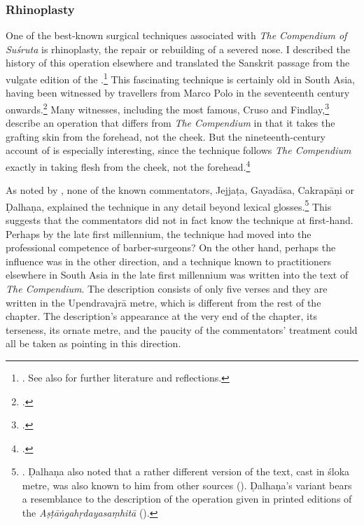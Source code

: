 \subsubsection{Rhinoplasty}
\label{sec:rhinoplasty}

One of the best-known surgical techniques associated with \emph{The 
Compendium of
    Suśruta} is rhinoplasty, the repair or rebuilding of a severed nose. I described
the history of this operation elsewhere and translated the Sanskrit passage from
the vulgate edition of the \SS.\footnote{\cite[67--70, 99--100]{wuja-2003}. See
also \cite[IB, 327--328, note 186]{meul-hist} for further literature and
reflections.}  This fascinating technique is certainly old in South Asia, having
been witnessed by travellers from Marco Polo in the seventeenth century
onwards.\footcite[ii.301]{manu-stor} Many witnesses, including the most famous,
Cruso and Findlay,\footcite[883, 891\,f.]{cowasjee} describe an operation that
differs from \emph{The Compendium} in that it takes the grafting skin from the
forehead, not the cheek.  But the nineteenth-century account of
\citeauthor{thor-bann} is especially interesting, since the technique follows
\emph{The Compendium} exactly in taking flesh from the cheek, not the
forehead.\footcite[352--3]{thor-bann}

As noted by \citeauthor{meul-hist}, none of
the known commentators, Jejjaṭa, Gayadāsa, Cakrapāṇi or Ḍalhaṇa, explained the
technique in any detail beyond lexical glosses.\footnote{\cite[IB,
328]{meul-hist}. Ḍalhaṇa also noted that a rather different version of the text,
cast in śloka metre, was also known to him from other sources
().  Ḍalhaṇa's variant bears a resemblance to the 
description
of the operation given in printed editions of the \emph{Aṣṭāṅgahṛdayasaṃhitā}
().} %
This suggests that the commentators did not in fact know the technique at
first-hand. Perhaps by the late first millennium, the technique had moved into the
professional competence of barber-surgeons?  On the other hand, perhaps the
influence was in the other direction, and a technique known to practitioners
elsewhere in South Asia in the late first millennium was written into the text of
\emph{The Compendium}. The description consists of only five verses and they 
are
written in the Upendravajrā metre, which is different from the rest of the
chapter.  The description's appearance at the very end of the chapter, its
terseness, its ornate metre, and the paucity of the commentators' treatment could
all be taken as pointing in this direction.

